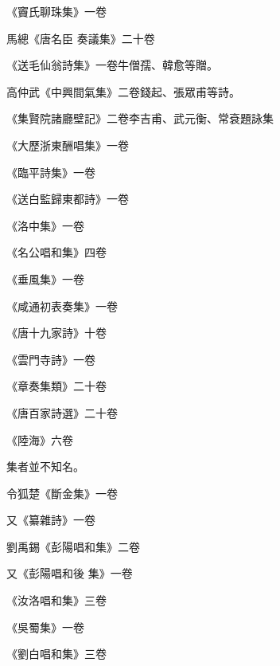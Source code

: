 \begin{pinyinscope}
 《竇氏聊珠集》一卷



 馬總《唐名臣
 奏議集》二十卷



 《送毛仙翁詩集》一卷牛僧孺、韓愈等贈。



 高仲武《中興間氣集》二卷錢起、張眾甫等詩。



 《集賢院諸廳壁記》二卷李吉甫、武元衡、常袞題詠集



 《大歷浙東酬唱集》一卷



 《臨平詩集》一卷



 《送白監歸東都詩》一卷



 《洛中集》一卷



 《名公唱和集》四卷



 《垂風集》一卷



 《咸通初表奏集》一卷



 《唐十九家詩》十卷



 《雲門寺詩》一卷



 《章奏集類》二十卷



 《唐百家詩選》二十卷



 《陸海》六卷



 集者並不知名。



 令狐楚《斷金集》一卷



 又《纂雜詩》一卷



 劉禹錫《彭陽唱和集》二卷



 又《彭陽唱和後
 集》一卷



 《汝洛唱和集》三卷



 《吳蜀集》一卷



 《劉白唱和集》三卷




\end{pinyinscope}
